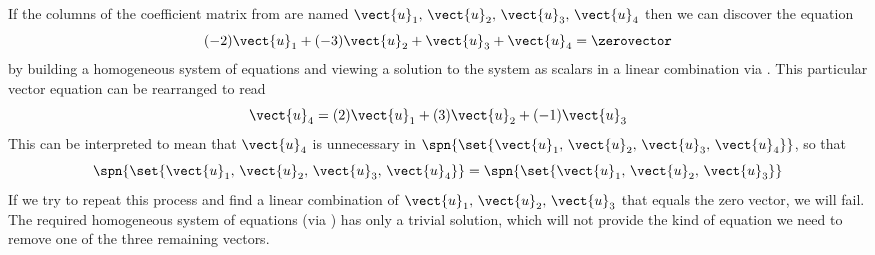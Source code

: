 If the columns of the coefficient matrix from  are named $\vect{u}_1,\,\vect{u}_2,\,\vect{u}_3,\,\vect{u}_4$ then we can discover the equation 
%
\begin{equation*}
(-2)\vect{u}_1+(-3)\vect{u}_2+\vect{u}_3+\vect{u}_4=\zerovector
\end{equation*}
%
by building a homogeneous system of equations and viewing a solution to the system as scalars in a linear combination via .  This particular vector equation can be rearranged to read
%
\begin{equation*}
\vect{u}_4=(2)\vect{u}_1+(3)\vect{u}_2+(-1)\vect{u}_3
\end{equation*}
%
This can be interpreted to mean that $\vect{u}_4$ is unnecessary in 
$\spn{\set{\vect{u}_1,\,\vect{u}_2,\,\vect{u}_3,\,\vect{u}_4}}$, so that 
%
\begin{equation*}
\spn{\set{\vect{u}_1,\,\vect{u}_2,\,\vect{u}_3,\,\vect{u}_4}}
=
\spn{\set{\vect{u}_1,\,\vect{u}_2,\,\vect{u}_3}}
\end{equation*}
%
If we try to repeat this process and find a linear combination of $\vect{u}_1,\,\vect{u}_2,\,\vect{u}_3$ that equals the zero vector, we will fail.  The required homogeneous system of equations (via ) has only a trivial solution, which will not provide the kind of equation we need to remove one of the three remaining vectors.